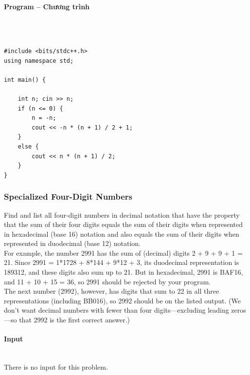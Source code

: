 \documentclass{article}
\begin{document}
\paragraph{Program -- Chương trình} \mbox{} \\


\begin{lstlisting}

#include <bits/stdc++.h>
using namespace std;

int main() {

	int n; cin >> n;
	if (n <= 0) {
		n = -n;
		cout << -n * (n + 1) / 2 + 1;
	}
	else {
		cout << n * (n + 1) / 2;
	}
}

\end{lstlisting}



\subsubsection{Specialized Four-Digit Numbers}

Find and list all four-digit numbers in decimal notation that have the property that the sum of their four digits equals the sum of their digits when represented in hexadecimal (base 16) notation and also equals the sum of their digits when represented in duodecimal (base 12) notation. \\

For example, the number 2991 has the sum of (decimal) digits 2 + 9 + 9 + 1 = 21. Since 2991 = 1*1728 + 8*144 + 9*12 + 3, its duodecimal representation is 189312, and these digits also sum up to 21. But in hexadecimal, 2991 is BAF16, and 11 + 10 + 15 = 36, so 2991 should be rejected by your program.\\

The next number (2992), however, has digits that sum to 22 in all three representations (including BB016), so 2992 should be on the listed output. (We don’t want decimal numbers with fewer than four digits—excluding leading zeros—so that 2992 is the first correct answer.) \\

\paragraph{Input} \mbox{} \\

There is no input for this problem.
\end{document}

